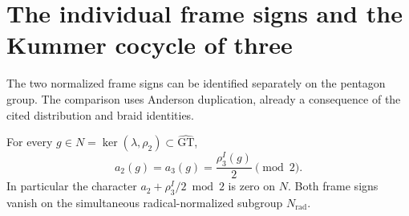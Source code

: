 \section{The individual frame signs and the Kummer cocycle of three}
\label{sec:harmonic-kummer-comparison}

The two normalized frame signs can be identified separately on the
pentagon group. The comparison uses Anderson duplication, already a
consequence of the cited distribution and braid identities.

\begin{theorem}\label{thm:individual-frame-kummer}
For every $g\in N=\ker(\lambda,\rho_2)\subset\widehat{\mathrm{GT}}$,
\[
 a_2(g)=a_3(g)=\frac{\rho_3^I(g)}2\pmod2.
\]
In particular the character
$a_2+\rho_3^I/2\bmod2$ is zero on $N$. Both frame signs vanish
on the simultaneous radical-normalized subgroup $N_{\mathrm{rad}}$.
\end{theorem}
